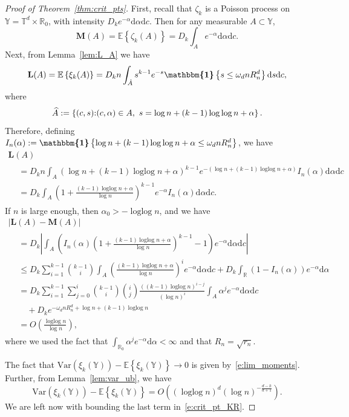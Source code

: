 \documentclass[10pt]{amsart}
\theoremstyle{definition}\newtheorem{defi}[theo]{Definition}\newtheorem{rema}[theo]{Remark}\newtheorem{exam}[theo]{Example}\newtheorem{exem}[theo]{Example}\newtheorem{nota}[theo]{Notation}
\DeclareMathOperator{\logg}{\log\log}
\newcommand*\bL{\mathbf{L}}
\newcommand*\bM{\mathbf{M}}
\newcommand*\R{\mathbb{R}}
\newcommand*\T{\mathbb{T}}
\newcommand*\Y{\mathbb{Y}}
\newcommand{\E}{\mathbb{E}}
\newcommand*\md{\mathrm{d}}
\newcommand{\mean}[1] {\E\left\{{#1}\right\}}
\newcommand{\ind}{\boldsymbol{\mathbbm{1}}}
\newcommand{\var}[1]{\mathrm{Var}\param{{#1}}}
\newcommand{\set}[1]{\left\{#1\right\}}
\newcommand{\param}[1]{\left(#1\right)}
\newcommand{\abs}[1] {\left| {#1}\right|}
\let\oldhat\hat
\renewcommand*{\hat}[1]{\mathchoice{\widehat{#1}}{\widehat{#1}}{\oldhat{#1}}{\oldhat{#1}}}
\begin{document}
\begin{proof}[Proof of Theorem~\ref{thm:crit_pts}]
First, recall that $\zeta_k$ is a Poisson process on $\Y = \T^d\times\R_0$, with intensity $D_k e^{-\alpha}\md\alpha \md c$. Then for any measurable $A\subset \Y$,
\[
\bM(A) = \mean{\zeta_k(A)} = D_k\int_A e^{-\alpha}\md\alpha \md c.
\]
Next, from Lemma~\ref{lem:L_A} we have
\[
\bL(A) = \mean{\xi_k(A)} = D_k n \int_{\hat A} s^{k-1}e^{-s} \ind\set{s\le \omega_d n R_n^d } \md s \md c,
\]
where
\[
\hat A := \set{(c,s) {:} (c,\alpha)\in A,\ s = \log n + (k-1)\logg n + \alpha}.
\]
Therefore, defining $I_n(\alpha):= \ind\set{\log n + (k-1)\logg n + \alpha \le \omega_d n R_n^d}$, we have
\begin{multline}\label{e:defnLcrit}
\bL(A)\\
\begin{aligned}
&= D_k n \int_{A} \left(\log n + (k-1)\logg n + \alpha\right)^{k-1}e^{-\left(\log n + (k-1)\logg n + \alpha\right)} I_n(\alpha) \md\alpha \md c \\
&= D_k \int_{A} \param{1+\frac{ (k-1)\logg n + \alpha}{\log n}}^{k-1} e^{- \alpha} I_n(\alpha) \md\alpha \md c.
\end{aligned}
\end{multline}
If $n$ is large enough, then $\alpha_0 > -\logg n$, and we have
\begin{multline}\label{e:cp_bound_1}
\left|\bL(A)-\bM(A)\right|\\
\begin{aligned}
&= D_k \abs{\int_{A} \param{I_n(\alpha)\param{1+\frac{(k-1)\logg n+ \alpha}{\log n}}^{k-1}-1}e^{-\alpha} \md\alpha \md c}\\
&\le D_k \sum_{i=1}^{k-1}\binom{k-1}{i} \int_{A}\param{\frac{(k-1)\logg n + \alpha}{\log n}}^i e^{-\alpha} \md\alpha \md c + D_k \int_{\R} (1-I_n(\alpha)) e^{-\alpha} \md \alpha\\
&= D_k \sum_{i=1}^{k-1}\sum_{j=0}^{i}\binom{k-1}{i}\binom{i}{j} \frac{((k-1)\logg n)^{i-j}}{(\log n)^i}\int_{A} \alpha^j e^{-\alpha}\md\alpha \md c \\
& \quad + D_k e^{-\omega_d n R_n^d +\log n +(k-1)\logg n}\\
&= O\param{\frac{\logg n}{\log n}},
\end{aligned}
\end{multline}
where we used the fact that $\int_{\R_0}\alpha^j e^{-\alpha}\md\alpha < \infty$ and that $R_n=\sqrt{r_n}$.

The fact that $\var{\xi_k(\Y)} - \mean{\xi_k(\Y)} \to 0$ is given by~\eqref{e:lim_moments}. Further, from Lemma~\ref{lem:var_ub}, we have
\begin{equation}\label{e:cp_bound_2}
\var{\xi_k(\Y)} - \mean{\xi_k(\Y)} = O\param{(\logg n)^d(\log n)^{-\frac{d-k}{d+1}}}.
\end{equation}
We are left now with bounding the last term in~\eqref{e:crit_pt_KR}.


\end{proof}
\end{document}
